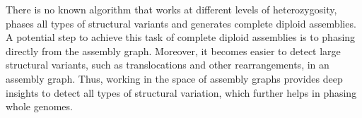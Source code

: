 % 


There is no known algorithm that works at different levels of heterozygosity, phases all types of structural variants and generates complete diploid assemblies.
A potential step to achieve this task of complete diploid assemblies is to phasing directly from the assembly graph.
Moreover, it becomes easier to detect large structural variants, such as translocations and other rearrangements, in an assembly graph.
Thus, working in the space of assembly graphs provides deep insights to detect all types of structural variation, which further helps in phasing whole genomes.

